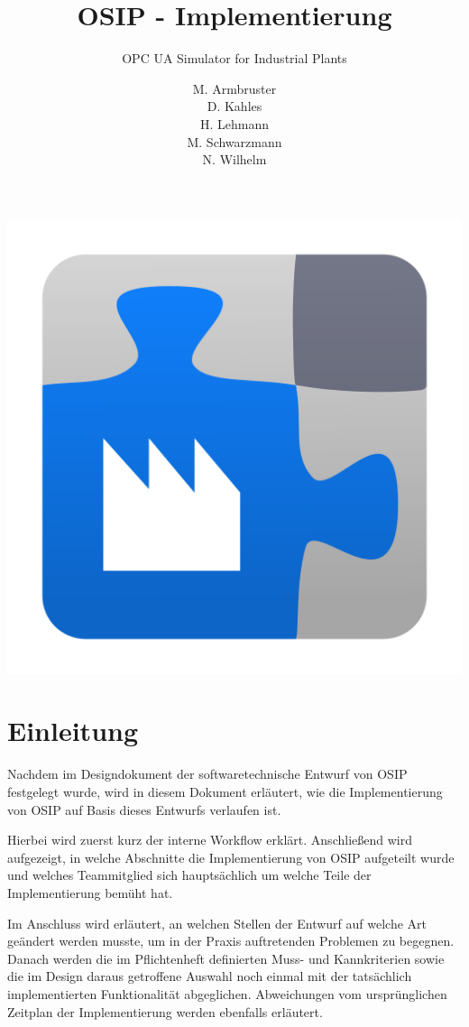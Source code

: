 \documentclass[parskip=full]{scrartcl}
\title{OSIP - Implementierung}
\subtitle{OPC UA Simulator for Industrial Plants}
\author{
    M. Armbruster\\
    D. Kahles\\
    H. Lehmann\\
    M. Schwarzmann\\
    N. Wilhelm
}
\begin{document}
\maketitle
\thispagestyle{empty}
\vspace{20px}
\begin{center}
  \includegraphics[scale=0.4]{../icon.png}
\end{center}
\pagebreak
\tableofcontents
\pagebreak

\section{Einleitung}
Nachdem im Designdokument der softwaretechnische Entwurf von OSIP festgelegt wurde, wird in diesem Dokument erläutert, wie die Implementierung von OSIP auf Basis
dieses Entwurfs verlaufen ist.

Hierbei wird zuerst kurz der interne Workflow erklärt. Anschließend wird aufgezeigt, in welche Abschnitte die Implementierung von OSIP aufgeteilt wurde und
welches Teammitglied sich hauptsächlich um welche Teile der Implementierung bemüht hat.

Im Anschluss wird erläutert, an welchen Stellen der Entwurf auf welche Art geändert werden musste, um in der Praxis auftretenden Problemen zu begegnen. Danach
werden die im Pflichtenheft definierten Muss- und Kannkriterien sowie die im Design daraus getroffene Auswahl noch einmal mit der tatsächlich implementierten
Funktionalität abgeglichen. Abweichungen vom ursprünglichen Zeitplan der Implementierung werden ebenfalls erläutert.
\end{document}
